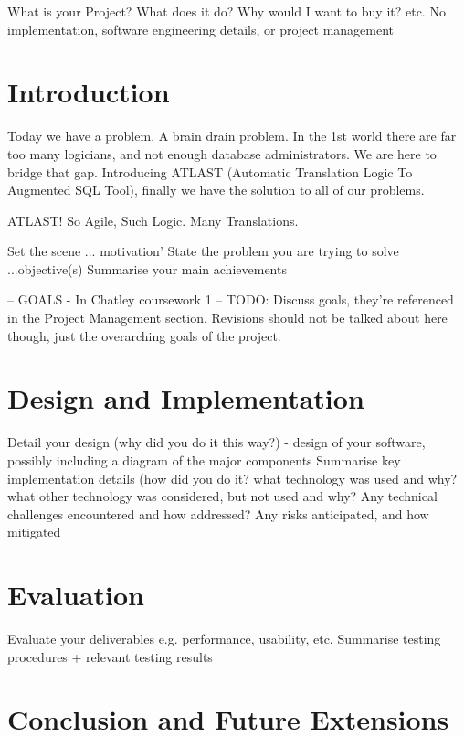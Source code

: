 \documentclass[a4wide, 11pt]{article} \usepackage{a4, fullpage}
\begin{document}
        What is your Project? What does it do? Why would I want to buy it? etc.
        No implementation, software engineering details, or project management

\section{Introduction}

Today we have a problem. A brain drain problem. In the 1st world there are 
far too many logicians, and not enough database administrators. We are here
to bridge that gap. Introducing ATLAST (Automatic Translation Logic To Augmented SQL Tool), finally we have the solution to all of our problems.

ATLAST! So Agile, Such Logic. Many Translations.


        Set the scene ... motivation'
        State the problem you are trying to solve ...objective(s)
        Summarise your main achievements 

        -- GOALS - In Chatley coursework 1 --
        TODO: Discuss goals, they're referenced in the Project Management
        section. Revisions should not be talked about here though, just the
        overarching goals of the project.

\section{Design and Implementation}

        Detail your design (why did you do it this way?) - design of your software, possibly including a diagram of the major components
        Summarise key implementation details (how did you do it? what technology was used and why? what other technology was considered, but not used and why?
        Any technical challenges encountered and how addressed?
        Any risks anticipated, and how mitigated 

\section{Evaluation}

        Evaluate your deliverables e.g. performance, usability, etc.
        Summarise testing procedures + relevant testing results 

\section{Conclusion and Future Extensions}
\end{document}
